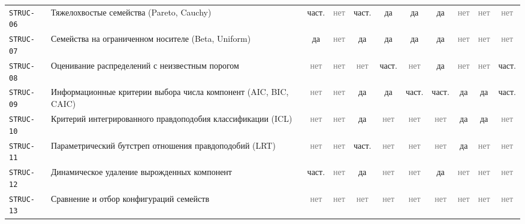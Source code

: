 \documentclass[10pt,a4paper]{article}
\begin{document}
\begin{landscape}
{\begin{longtable}{@{}l >{\raggedright\arraybackslash}p{8.0cm} *{9}{c}@{}}
\texttt{STRUC-06} & Тяжелохвостые семейства (Pareto, Cauchy) & \cellcolor{part!40}част. & \textcolor{gray}{нет} & \cellcolor{part!40}част. & \cellcolor{yes!30}да & \cellcolor{yes!30}да & \cellcolor{yes!30}да & \textcolor{gray}{нет} & \textcolor{gray}{нет} & \textcolor{gray}{нет} \\
\texttt{STRUC-07} & Семейства на ограниченном носителе (Beta, Uniform) & \cellcolor{yes!30}да & \textcolor{gray}{нет} & \cellcolor{yes!30}да & \cellcolor{yes!30}да & \cellcolor{yes!30}да & \cellcolor{yes!30}да & \textcolor{gray}{нет} & \textcolor{gray}{нет} & \textcolor{gray}{нет} \\
\texttt{STRUC-08} & Оценивание распределений с неизвестным порогом & \textcolor{gray}{нет} & \textcolor{gray}{нет} & \textcolor{gray}{нет} & \cellcolor{part!40}част. & \textcolor{gray}{нет} & \cellcolor{yes!30}да & \textcolor{gray}{нет} & \textcolor{gray}{нет} & \cellcolor{part!40}част. \\
\texttt{STRUC-09} & Информационные критерии выбора числа компонент (AIC, BIC, CAIC) & \textcolor{gray}{нет} & \textcolor{gray}{нет} & \cellcolor{yes!30}да & \cellcolor{yes!30}да & \cellcolor{part!40}част. & \cellcolor{part!40}част. & \cellcolor{yes!30}да & \cellcolor{yes!30}да & \cellcolor{part!40}част. \\
\texttt{STRUC-10} & Критерий интегрированного правдоподобия классификации (ICL) & \textcolor{gray}{нет} & \textcolor{gray}{нет} & \cellcolor{yes!30}да & \textcolor{gray}{нет} & \textcolor{gray}{нет} & \textcolor{gray}{нет} & \cellcolor{yes!30}да & \cellcolor{yes!30}да & \textcolor{gray}{нет} \\
\texttt{STRUC-11} & Параметрический бутстреп отношения правдоподобий (LRT) & \textcolor{gray}{нет} & \textcolor{gray}{нет} & \cellcolor{part!40}част. & \textcolor{gray}{нет} & \textcolor{gray}{нет} & \textcolor{gray}{нет} & \cellcolor{yes!30}да & \textcolor{gray}{нет} & \textcolor{gray}{нет} \\
\texttt{STRUC-12} & Динамическое удаление вырожденных компонент & \cellcolor{part!40}част. & \textcolor{gray}{нет} & \cellcolor{yes!30}да & \textcolor{gray}{нет} & \textcolor{gray}{нет} & \cellcolor{yes!30}да & \textcolor{gray}{нет} & \textcolor{gray}{нет} & \textcolor{gray}{нет} \\
\texttt{STRUC-13} & Сравнение и отбор конфигураций семейств & \textcolor{gray}{нет} & \textcolor{gray}{нет} & \textcolor{gray}{нет} & \textcolor{gray}{нет} & \textcolor{gray}{нет} & \textcolor{gray}{нет} & \textcolor{gray}{нет} & \textcolor{gray}{нет} & \textcolor{gray}{нет} \\

\end{longtable}}
\end{landscape}
\end{document}
